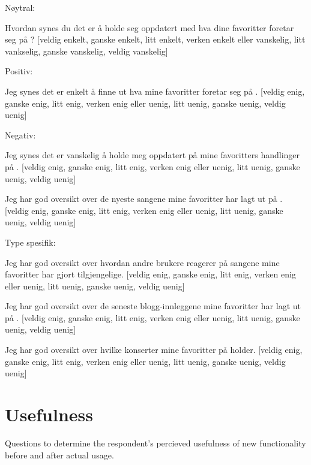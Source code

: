 \begin{items}
  \item Nøytral:
  \item Hvordan synes du det er å holde seg oppdatert med hva dine favoritter
    foretar seg på \urort{}?
    [veldig enkelt, ganske enkelt, litt enkelt,
    verken enkelt eller vanskelig,
    litt vankselig, ganske vanskelig, veldig vanskelig]
  \item Positiv:
  \item Jeg synes det er enkelt å finne ut hva mine favoritter
    foretar seg på \urort{}.
    [veldig enig, ganske enig, litt enig,
    verken enig eller uenig,
    litt uenig, ganske uenig, veldig uenig]
  \item Negativ:
  \item Jeg synes det er vanskelig å holde meg oppdatert på mine
    favoritters handlinger på \urort{}.
    [veldig enig, ganske enig, litt enig,
    verken enig eller uenig,
    litt uenig, ganske uenig, veldig uenig]
  \item Jeg har god oversikt over de nyeste sangene mine favoritter
    har lagt ut på \urort{}.
    [veldig enig, ganske enig, litt enig,
    verken enig eller uenig,
    litt uenig, ganske uenig, veldig uenig]
  \item Type spesifik:
  \item Jeg har god oversikt over hvordan andre \urort{} brukere reagerer på
    sangene mine favoritter har gjort tilgjengelige.
    [veldig enig, ganske enig, litt enig,
    verken enig eller uenig,
    litt uenig, ganske uenig, veldig uenig]
  \item Jeg har god oversikt over de seneste blogg-innleggene
    mine favoritter har lagt ut på \urort{}.
    [veldig enig, ganske enig, litt enig,
    verken enig eller uenig,
    litt uenig, ganske uenig, veldig uenig]
  \item Jeg har god oversikt over hvilke konserter mine favoritter
    på \urort{} holder.
    [veldig enig, ganske enig, litt enig,
    verken enig eller uenig,
    litt uenig, ganske uenig, veldig uenig]
\end{items}

\section{Usefulness}

Questions to determine the respondent's percieved usefulness of new
functionality before and after actual usage.


